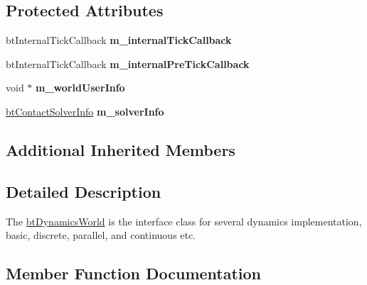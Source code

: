 \subsection*{Protected Attributes}
\begin{DoxyCompactItemize}
\item 
\mbox{\label{classbtDynamicsWorld_a705c6e3e8c08da630f5c6ad47fb0956e}} 
bt\+Internal\+Tick\+Callback {\bfseries m\+\_\+internal\+Tick\+Callback}
\item 
\mbox{\label{classbtDynamicsWorld_a72c993a0878ed549579516b9e123b87a}} 
bt\+Internal\+Tick\+Callback {\bfseries m\+\_\+internal\+Pre\+Tick\+Callback}
\item 
\mbox{\label{classbtDynamicsWorld_a417f955222ba499bccdd85dbac972673}} 
void $\ast$ {\bfseries m\+\_\+world\+User\+Info}
\item 
\mbox{\label{classbtDynamicsWorld_a3e879581a620599c279b64bedaf8d583}} 
\hyperlink{structbtContactSolverInfo}{bt\+Contact\+Solver\+Info} {\bfseries m\+\_\+solver\+Info}
\end{DoxyCompactItemize}
\subsection*{Additional Inherited Members}


\subsection{Detailed Description}
The \hyperlink{classbtDynamicsWorld}{bt\+Dynamics\+World} is the interface class for several dynamics implementation, basic, discrete, parallel, and continuous etc. 

\subsection{Member Function Documentation}
\mbox{\label{classbtDynamicsWorld_a5ab26a0d6e8b2b21fbde2ed8f8dd6294}} 
